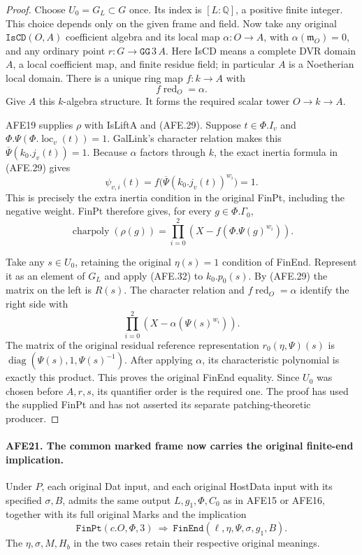 \begin{proof}
Choose \(U_0=G_L\subset G\) once.
Its index is \([L:\mathbb Q]\), a positive finite
integer.  This choice depends only on the given
frame and field.
Now take any original \(\texttt{IsCD}(O,A)\)
coefficient algebra and its local map
\(\alpha:O\to A\), with
\(\alpha(\mathfrak m_O)=0\), and any ordinary point
\(r:G\to\texttt{GG}\,3\,A\).
Here IsCD means a complete DVR domain \(A\), a
local coefficient map, and finite residue field;
in particular \(A\) is a Noetherian local domain.
There is a unique ring map \(f:k\to A\) with
\[
                         f\operatorname{red}_O=\alpha.
 \]
Give \(A\) this \(k\)-algebra structure.
It forms the required scalar tower \(O\to k\to A\).

AFE19 supplies \(\rho\) with IsLiftA and (AFE.29).
Suppose \(t\in\Phi.I_v\) and
\(\Phi.\Psi(\Phi.\operatorname{loc}_v(t))=1\).
GalLink's character relation makes this
\(\overline\Psi(k_0.j_v(t))=1\).
Because \(\alpha\) factors through \(k\), the exact
inertia formula in (AFE.29) gives
\[
                    \psi_{v,i}(t)
                       =f\bigl(\overline\Psi(k_0.j_v(t))^{w_i}\bigr)
                       =1.
 \]
This is precisely the extra inertia condition in
the original FinPt, including the negative weight.
FinPt therefore gives, for every \(g\in\Phi.\Gamma_0\),
\[
       \operatorname{charpoly}(\rho(g))
         =\prod_{i=0}^{2}
                 \left(X-f(\Phi.\Psi(g)^{w_i})\right).
                                                        \tag{AFE.32}
\]

Take any \(s\in U_0\), retaining the original
\(\eta(s)=1\) condition of FinEnd.
Represent it as an element of \(G_L\) and apply
(AFE.32) to \(k_0.p_0(s)\).
By (AFE.29) the matrix on the left is \(R(s)\).
The character relation and \(f\operatorname{red}_O=\alpha\)
identify the right side with
\[
                  \prod_{i=0}^{2}(X-\alpha(\Psi(s)^{w_i})).
 \]
The matrix of the original residual reference
representation \(r_0(\eta,\Psi)(s)\) is
\(\operatorname{diag}(\Psi(s),1,\Psi(s)^{-1})\).
After applying \(\alpha\), its characteristic
polynomial is exactly this product.
This proves the original FinEnd equality.
Since \(U_0\) was chosen before \(A,r,s\), its
quantifier order is the required one.
The proof has used the supplied FinPt and has not
asserted its separate patching-theoretic producer.
\end{proof}

\paragraph{AFE21. The common marked frame now carries the original finite-end implication.}
\label{claim:AFE21}
Under \(P\), each original Dat input, and each original
HostData input with its specified \(\sigma,B\), admits
the same output \(L,g_1,\Phi,C_0\) as in AFE15 or
AFE16, together with its full original Marks and
the implication
\[
          \texttt{FinPt}(c.O,\Phi,3)
              \ \Longrightarrow\
          \texttt{FinEnd}(\ell,\eta,\Psi,\sigma,g_1,B).
                                                        \tag{AFE.33}
\]
The \(\eta,\sigma,M,H_b\) in the two cases retain
their respective original meanings.

